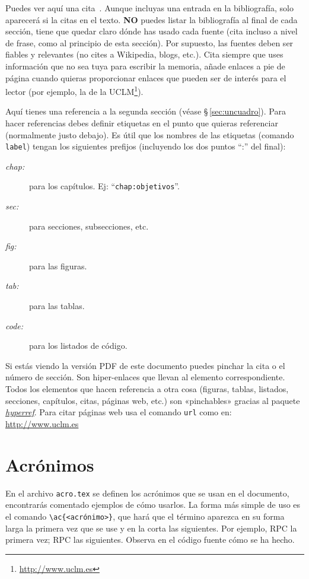 Puedes ver aquí una cita~\cite{design_patterns}. Aunque incluyas una entrada en la bibliografía, solo aparecerá si la citas en el texto. \textbf{NO} puedes listar la bibliografía al final de cada sección, tiene que quedar claro dónde has usado cada fuente (cita incluso a nivel de frase, como al principio de esta sección). Por supuesto, las fuentes deben ser fiables y relevantes (no cites a Wikipedia, blogs, etc.). Cita siempre que uses información que no sea tuya para escribir la memoria, añade enlaces a pie de página cuando quieras proporcionar enlaces que pueden ser de interés para el lector (por ejemplo, la de la \acs{UCLM}\footnote{\url{http://www.uclm.es}}).

Aquí tienes una referencia a la segunda sección (véase \S\,\ref{sec:uncuadro}). Para hacer referencias debes definir etiquetas en el punto que quieras referenciar (normalmente justo debajo). Es útil que los nombres de las etiquetas (comando \texttt{label}) tengan los siguientes prefijos (incluyendo los dos puntos ``:'' del final):

\begin{description}
  \item[\emph{chap:}] para los capítulos. Ej: ``\texttt{chap:objetivos}''.
  \item[\emph{sec:}] para secciones, subsecciones, etc.
  \item[\emph{fig:}] para las figuras.
  \item[\emph{tab:}] para las tablas.
  \item[\emph{code:}] para los listados de código.
\end{description}

Si estás viendo la versión PDF de este documento puedes pinchar la cita o el número de sección. Son hiper-enlaces que llevan al elemento correspondiente. Todos los elementos que hacen referencia a otra cosa (figuras, tablas, listados, secciones, capítulos, citas, páginas web, etc.) son «pinchables» gracias al paquete \href{http://latex.tugraz.at/_media/docs/hyperref.pdf}{\emph{hyperref}}. Para citar páginas web usa el comando \texttt{url} como en: \url{http://www.uclm.es}

\section{Acrónimos}
En el archivo \texttt{acro.tex} se definen los acrónimos que se usan en el documento, encontrarás comentado ejemplos de cómo usarlos. La forma más simple de uso es el comando \texttt{\textbackslash ac\{<acrónimo>\}}, que hará que el término aparezca en su forma larga la primera vez que se use y en la corta las siguientes. Por ejemplo, \ac{RPC} la primera vez; \ac{RPC} las siguientes. Observa en el código fuente cómo se ha hecho.



